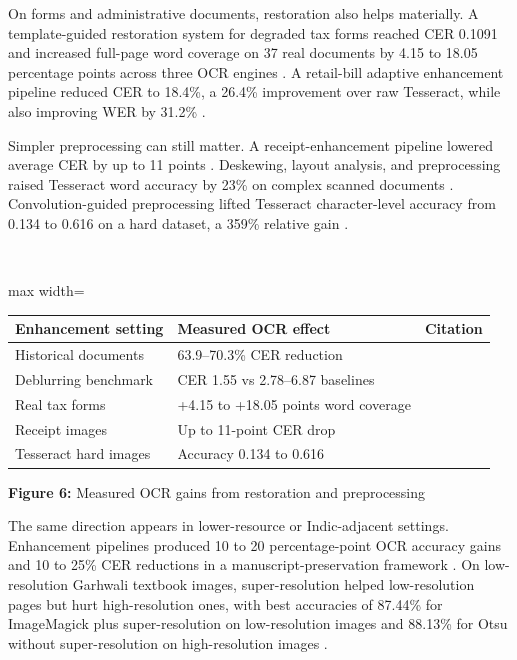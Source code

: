     
    On forms and administrative documents, restoration also helps materially. A template-guided restoration system for degraded tax forms reached CER 0.1091 and increased full-page word coverage on 37 real documents by 4.15 to 18.05 percentage points across three OCR engines  \cite{PeñaRojas2026A}. A retail-bill adaptive enhancement pipeline reduced CER to 18.4\%, a 26.4\% improvement over raw Tesseract, while also improving WER by 31.2\%  \cite{Gaikwad2026Benchmarking}.
    
    
    Simpler preprocessing can still matter. A receipt-enhancement pipeline lowered average CER by up to 11 points  \cite{Auad2024A}. Deskewing, layout analysis, and preprocessing raised Tesseract word accuracy by 23\% on complex scanned documents  \cite{Pham2022IMPROVED}. Convolution-guided preprocessing lifted Tesseract character-level accuracy from 0.134 to 0.616 on a hard dataset, a 359\% relative gain  \cite{Sporici2020Improving}.
    
    
    \mbox{}\\
    \begin{adjustbox}{max width=\textwidth}
    \begin{tabular}{p{5.3cm} | p{5.3cm} | p{5.3cm}}
    \hline
    Enhancement setting & Measured OCR effect & Citation \\
    \hline
    Historical documents & 63.9–70.3\% CER reduction & \cite{Guan2025PreP-OCR:} \\
    Deblurring benchmark & CER 1.55 vs 2.78–6.87 baselines & \cite{Cicchetti2024NAF-DPM:} \\
    Real tax forms & +4.15 to +18.05 points word coverage & \cite{PeñaRojas2026A} \\
    Receipt images & Up to 11-point CER drop & \cite{Auad2024A} \\
    Tesseract hard images & Accuracy 0.134 to 0.616 & \cite{Sporici2020Improving} \\
    \hline
    \end{tabular}
    \end{adjustbox}
    
    
    \textbf{Figure 6:} Measured OCR gains from restoration and preprocessing
    
    
    The same direction appears in lower-resource or Indic-adjacent settings. Enhancement pipelines produced 10 to 20 percentage-point OCR accuracy gains and 10 to 25\% CER reductions in a manuscript-preservation framework  \cite{Paulson2026Digital}. On low-resolution Garhwali textbook images, super-resolution helped low-resolution pages but hurt high-resolution ones, with best accuracies of 87.44\% for ImageMagick plus super-resolution on low-resolution images and 88.13\% for Otsu without super-resolution on high-resolution images  \cite{Rawat2021ANALYSIS}.
    
